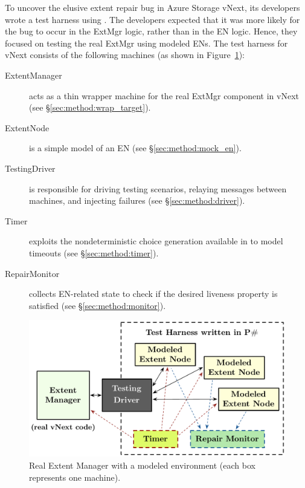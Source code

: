 To uncover the elusive extent repair bug in Azure Storage vNext, its developers wrote a test harness using \psharp. The developers expected that it was more likely for the bug to occur in the ExtMgr logic, rather than in the EN logic. Hence, they focused on testing the real ExtMgr using modeled ENs. The test harness for vNext consists of the following \psharp machines (as shown in Figure~\ref{fig:azurestoremodel}):
\begin{description}
\item[ExtentManager] acts as a thin wrapper machine for the real ExtMgr component in vNext (see \S\ref{sec:method:wrap_target}).

\item[ExtentNode] is a simple model of an EN (see \S\ref{sec:method:mock_en}).

\item[TestingDriver] is responsible for driving testing scenarios, relaying messages between machines, and injecting failures (see \S\ref{sec:method:driver}).

\item[Timer] exploits the nondeterministic choice generation available in \psharp to model timeouts (see \S\ref{sec:method:timer}).

\item[RepairMonitor] collects EN-related state to check if the desired liveness property is satisfied (see \S\ref{sec:method:monitor}).
\end{description}

\begin{figure}[t]
\centering
\includegraphics[width=\linewidth]{img/mocked_vnext}
\caption{Real Extent Manager with a modeled environment (each box represents one \psharp machine).}
\label{fig:azurestoremodel}
\vspace{-2mm}
\end{figure}

